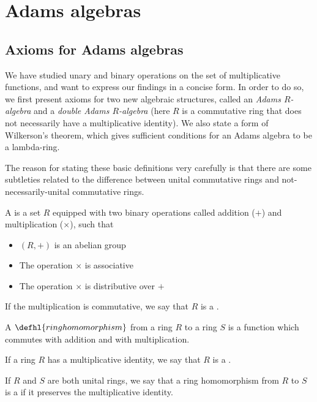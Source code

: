 
\section{Adams algebras}

\subsection{Axioms for Adams algebras}

We have studied unary and binary operations on the set of multiplicative functions, and want to express our findings in a concise form. In order to do so, we first present axioms for two new algebraic structures, called an \emph{Adams $R$-algebra} and a \emph{double Adams $R$-algebra} (here $R$ is a commutative ring that does not necessarily have a multiplicative identity). We also state a form of Wilkerson's theorem, which gives sufficient conditions for an Adams algebra to be a lambda-ring.

The reason for stating these basic definitions very carefully is that there are some subtleties related to the difference between unital commutative rings and not-necessarily-unital commutative rings.




\begin{definition}
A  is a set $R$ equipped with two binary operations called addition ($+$) and multiplication ($\times$), such that 
\begin{itemize}
\item $(R, +)$ is an abelian group
\item The operation $\times$ is associative
\item The operation $\times$ is distributive over $+$
\end{itemize}
If the multiplication is commutative, we say that $R$ is a .

A $\defhl{ring homomorphism}$ from a ring $R$ to a ring $S$ is a function which commutes with addition and with multiplication.

If a ring $R$ has a multiplicative identity, we say that $R$ is a .

If $R$ and $S$ are both unital rings, we say that a ring homomorphism from $R$ to $S$ is a  if it preserves the multiplicative identity.

\end{definition}




